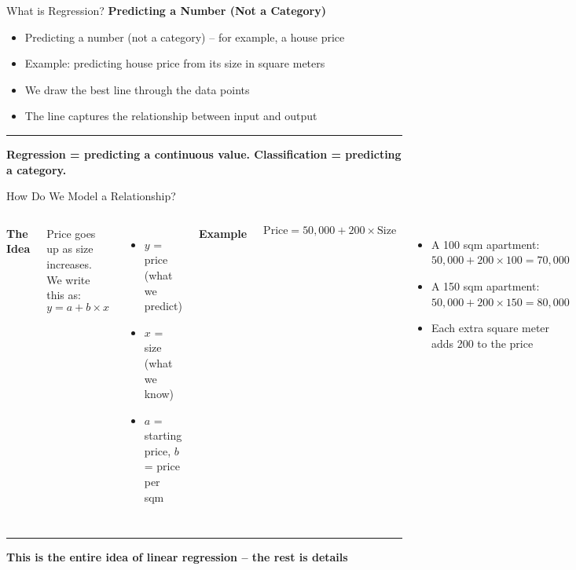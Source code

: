 \documentclass[8pt,aspectratio=169]{beamer}
\newcommand{\bottomnote}[1]{%
\vfill
\vspace{-2mm}
\textcolor{mllavender2}{\rule{\textwidth}{0.4pt}}
\vspace{1mm}
\footnotesize
\textbf{#1}
}
\begin{document}
\begin{frame}[t]{What is Regression?}
\textbf{Predicting a Number (Not a Category)}

\begin{itemize}
  \item Predicting a number (not a category) -- for example, a house price
  \item Example: predicting house price from its size in square meters
  \item We draw the best line through the data points
  \item The line captures the relationship between input and output
\end{itemize}

\bottomnote{Regression = predicting a continuous value. Classification = predicting a category.}
\end{frame}

\begin{frame}[t]{How Do We Model a Relationship?}
\begin{columns}[T]
\textbf{The Idea}

Price goes up as size increases. We write this as:
$$y = a + b \times x$$

\begin{itemize}
  \item $y$ = price (what we predict)
  \item $x$ = size (what we know)
  \item $a$ = starting price, $b$ = price per sqm
\end{itemize}

\textbf{Example}

$$\text{Price} = 50{,}000 + 200 \times \text{Size}$$

\begin{itemize}
  \item A 100 sqm apartment: $50{,}000 + 200 \times 100 = 70{,}000$
  \item A 150 sqm apartment: $50{,}000 + 200 \times 150 = 80{,}000$
  \item Each extra square meter adds 200 to the price
\end{itemize}
\end{columns}

\bottomnote{This is the entire idea of linear regression -- the rest is details}
\end{frame}
\end{document}
